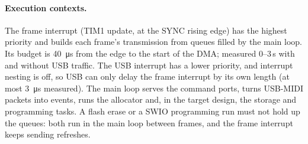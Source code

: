 \paragraph{Execution contexts.} The frame interrupt (TIM1 update, at the SYNC rising edge) has the highest priority
and builds each frame's transmission from queues filled by the main loop. Its budget is \SI{40}{\micro s} from the
edge to the start of the DMA; measured 0--3\,\textmu s with and without USB traffic. The USB interrupt has a lower
priority, and interrupt nesting is off, so USB can only delay the frame interrupt by its own length (at most
\SI{3}{\micro s} measured). The main loop serves the command ports, turns USB-MIDI packets into events, runs the
allocator and, in the target design, the storage and programming tasks. A flash erase or a SWIO programming run must
not hold up the queues: both run in the main loop between frames, and the frame interrupt keeps sending refreshes.


